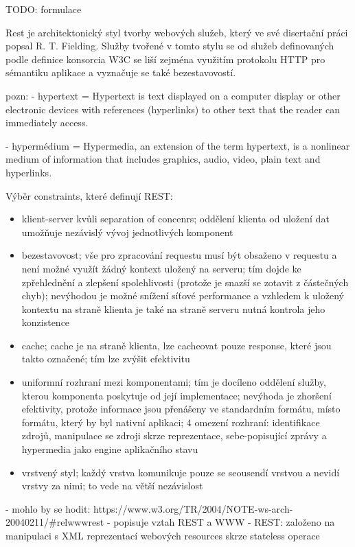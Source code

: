 \documentclass[czech,DP]{thesiskiv}
\begin{document}
%

TODO: formulace

Rest je architektonický styl tvorby webových služeb, který ve své disertační práci \cite{fielding2000rest} popsal R. T. Fielding. Služby tvořené v tomto stylu se od služeb definovaných podle definice konsorcia W3C se liší zejména využitím protokolu HTTP pro sémantiku aplikace a vyznačuje se také bezestavovostí. 

pozn:
- hypertext = Hypertext is text displayed on a computer display or other electronic devices with references (hyperlinks) to other text that the reader can immediately access.

- hypermédium = Hypermedia, an extension of the term hypertext, is a nonlinear medium of information that includes graphics, audio, video, plain text and hyperlinks.

Výběr constraints, které definují REST:
\begin{itemize}
	\item klient-server kvůli separation of concenrs; oddělení klienta od uložení dat umožňuje nezávislý vývoj jednotlivých komponent
	\item bezestavovost; vše pro zpracování requestu musí být obsaženo v requestu a není možné využít žádný kontext uložený na serveru; tím dojde ke zpřehlednění a zlepšení spolehlivosti (protože je snazší se zotavit z částečných chyb); nevýhodou je možné snížení síťové performance a vzhledem k uložený kontextu na straně klienta je také na straně serveru nutná kontrola jeho konzistence
	\item cache; cache je na straně klienta, lze cacheovat pouze response, které jsou takto označené; tím lze zvýšit efektivitu
	\item uniformní rozhraní mezi komponentami; tím je docíleno oddělení služby, kterou komponenta poskytuje od její implementace; nevýhoda je zhoršení efektivity, protože informace jsou přenášeny ve standardním formátu, místo formátu, který by byl nativní aplikaci; 4 omezení rozhraní: identifikace zdrojů, manipulace se zdroji skrze reprezentace, sebe-popisující zprávy a hypermedia jako engine aplikačního stavu
	\item vrstvený styl; každý vrstva komunikuje pouze se seousendí vrstvou a nevidí vrstvy za nimi; to vede na větší nezávislost
\end{itemize}

- mohlo by se hodit: https://www.w3.org/TR/2004/NOTE-ws-arch-20040211/\#relwwwrest
- popisuje vztah REST a WWW
- REST: založeno na manipulaci s XML reprezentací webových resources skrze stateless operace
\end{document}

